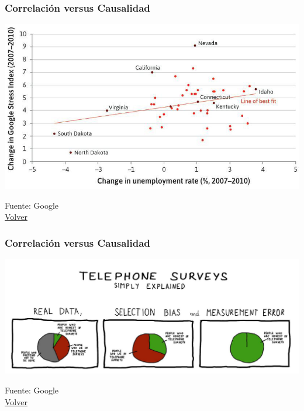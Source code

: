 \documentclass{beamer}
\begin{document}
\begin{frame} \label{hcuatro}
\frametitle{Correlación versus Causalidad}
\begin{center}
    \includegraphics[scale=0.35]{Figures/Introduccion_1.3_desempleoestres.jpg}
\end{center}
Fuente: Google \\
\hyperlink{uno}{Volver} 
\end{frame}

\begin{frame} \label{hcinco}
\frametitle{Correlación versus Causalidad}
\begin{center}
    \includegraphics[scale=0.25]{Figures/Introduccion_1.6_errormedicion.jpg}
\end{center}
Fuente: Google \\
\hyperlink{uno}{Volver} 
\end{frame}
\end{document}
